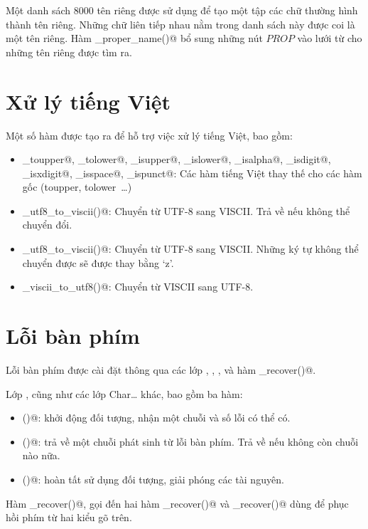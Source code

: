 \documentclass[a4paper,oneside,14pt]{extbook} %
\begin{document}
Một danh sách 8000 tên riêng được sử dụng để tạo một tập các chữ
thường hình thành tên riêng.
Những chữ liên tiếp nhau nằm trong danh sách này được coi là một tên
riêng. Hàm \verb@mark_proper_name()@ bổ sung những nút $PROP$ vào lưới
từ cho những tên riêng được tìm ra.

\section{Xử lý tiếng Việt}

Một số hàm được tạo ra để hỗ trợ việc xử lý tiếng Việt, bao gồm:
\begin{itemize}
\item \verb@viet_toupper@, \verb@viet_tolower@, \verb@viet_isupper@, \verb@viet_islower@,
  \verb@viet_isalpha@, \verb@viet_isdigit@, \verb@viet_isxdigit@, \verb@viet_isspace@,
  \verb@viet_ispunct@: Các hàm tiếng Việt thay thế cho các hàm gốc (toupper,
  tolower~\ldots)
\item \verb@viet_utf8_to_viscii()@: Chuyển từ UTF-8 sang VISCII. Trả
  về \verb@false@ nếu không thể chuyển đổi.
\item \verb@viet_utf8_to_viscii()@: Chuyển từ UTF-8 sang VISCII. Những
  ký tự không thể chuyển được sẽ được thay bằng `z'.
\item \verb@viet_viscii_to_utf8()@: Chuyển từ VISCII sang UTF-8.
\end{itemize}

\section{Lỗi bàn phím}

Lỗi bàn phím được cài đặt thông qua các lớp \verb@KeyRecover@,
\verb@CharInserter@, \verb@CharEraser@, \verb@CharTransposer@ và
hàm \verb@im_recover()@.

Lớp \verb@KeyRecover@, cũng như các lớp Char\ldots{} khác, bao gồm ba hàm:
\begin{itemize}
\item \verb@init()@: khởi động đối tượng, nhận một chuỗi và số lỗi có
  thể có.
\item \verb@step()@: trả về một chuỗi phát sinh từ lỗi bàn phím. Trả
  về \verb@false@ nếu không còn chuỗi nào nữa.
\item \verb@done()@: hoàn tất sử dụng đối tượng, giải phóng các tài
  nguyên.
\end{itemize}

Hàm \verb@im_recover()@, gọi đến hai hàm \verb@vni_recover()@ và
\verb@telex_recover()@ dùng để phục hồi phím từ hai kiểu gõ trên.
\end{document}
